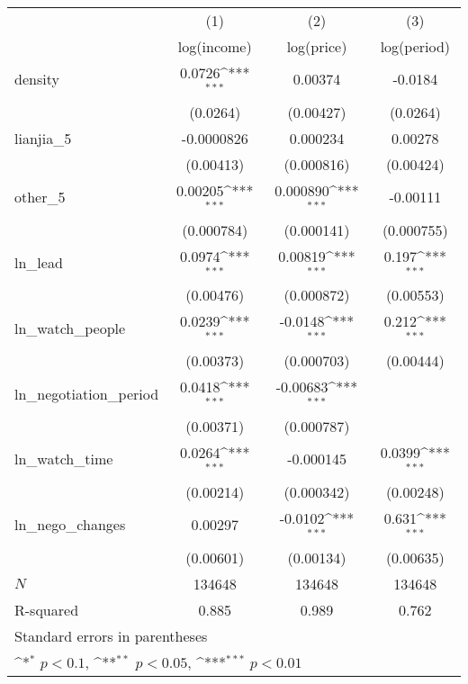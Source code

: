 {
\def\sym#1{\ifmmode^{#1}\else\(^{#1}\)\fi}
\begin{tabular}{l*{3}{c}}
\toprule
            &\multicolumn{1}{c}{(1)}&\multicolumn{1}{c}{(2)}&\multicolumn{1}{c}{(3)}\\
            &\multicolumn{1}{c}{log(income)}&\multicolumn{1}{c}{log(price)}&\multicolumn{1}{c}{log(period)}\\
\midrule
density     &      0.0726\sym{***}&     0.00374         &     -0.0184         \\
            &    (0.0264)         &   (0.00427)         &    (0.0264)         \\
\addlinespace
lianjia\_5   &  -0.0000826         &    0.000234         &     0.00278         \\
            &   (0.00413)         &  (0.000816)         &   (0.00424)         \\
\addlinespace
other\_5     &     0.00205\sym{***}&    0.000890\sym{***}&    -0.00111         \\
            &  (0.000784)         &  (0.000141)         &  (0.000755)         \\
\addlinespace
ln\_lead     &      0.0974\sym{***}&     0.00819\sym{***}&       0.197\sym{***}\\
            &   (0.00476)         &  (0.000872)         &   (0.00553)         \\
\addlinespace
ln\_watch\_people&      0.0239\sym{***}&     -0.0148\sym{***}&       0.212\sym{***}\\
            &   (0.00373)         &  (0.000703)         &   (0.00444)         \\
\addlinespace
ln\_negotiation\_period&      0.0418\sym{***}&    -0.00683\sym{***}&                     \\
            &   (0.00371)         &  (0.000787)         &                     \\
\addlinespace
ln\_watch\_time&      0.0264\sym{***}&   -0.000145         &      0.0399\sym{***}\\
            &   (0.00214)         &  (0.000342)         &   (0.00248)         \\
\addlinespace
ln\_nego\_changes&     0.00297         &     -0.0102\sym{***}&       0.631\sym{***}\\
            &   (0.00601)         &   (0.00134)         &   (0.00635)         \\
\midrule
\(N\)       &      134648         &      134648         &      134648         \\
R-squared   &       0.885         &       0.989         &       0.762         \\
\bottomrule
\multicolumn{4}{l}{\footnotesize Standard errors in parentheses}\\
\multicolumn{4}{l}{\footnotesize \sym{*} \(p<0.1\), \sym{**} \(p<0.05\), \sym{***} \(p<0.01\)}\\
\end{tabular}
}
